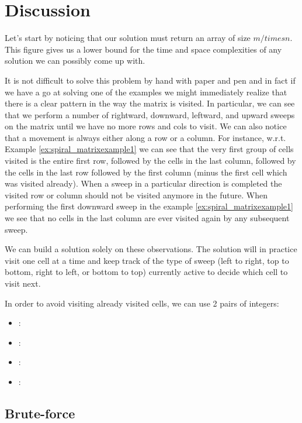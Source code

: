 \section{Discussion}
\label{spiral_matrix:sec:discussion}
Let's start by noticing that our solution must return an array of size $m /times n$. 
This figure gives us a lower bound for the time and space complexities of any solution we can possibly come up with.

It is not difficult to solve this problem by hand with paper and pen and in fact if we have a go at solving one of the examples we might immediately realize that there is a clear pattern in the way the matrix is visited. 
In particular, we can see that we perform a number of rightward, downward, leftward, and upward sweeps on the matrix until we have no more rows and cols to visit. 
We can also notice that a movement is always either along a row or a column. 
For instance, w.r.t. Example \ref{ex:spiral_matrixexample1} we can see that the very first group of cells visited is the entire first row, followed by the cells in the last column, followed by the cells in the last row followed by the first column (minus the first cell which was visited already). 
When a sweep in a particular direction is completed the visited row or column should not be visited anymore in the future. 
When performing the first downward sweep in the example \ref{ex:spiral_matrixexample1} we see that no cells in the last column are ever visited again by any subsequent sweep.

We can build a solution solely on these observations. The solution will in practice visit one cell at a time and keep track of the type of sweep (left to right, top to bottom, right to left, or bottom to top) currently active to decide which cell to visit next. 

In order to avoid visiting already visited cells, we can use 2 pairs of integers: 
\begin{itemize}
    \item {}:
    \item {}:
    \item {}:
    \item {}:
\end{itemize}


\subsection{Brute-force}
\label{spiral_matrix:sec:bruteforce}

    

